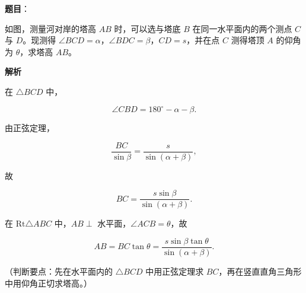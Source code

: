 \begin{answer}

\textbf{题目}：

如图，测量河对岸的塔高 $AB$ 时，可以选与塔底 $B$ 在同一水平面内的两个测点 $C$ 与 $D$。现测得 $\angle BCD=\alpha$，$\angle BDC=\beta$，$CD=s$，并在点 $C$ 测得塔顶 $A$ 的仰角为 $\theta$，求塔高 $AB$。
\nopagebreak[4]
\begin{center}\end{center}
\nopagebreak[4]
\textbf{解析}

在 $\triangle BCD$ 中，

\nopagebreak[4]
\[\angle CBD=180^\circ-\alpha-\beta.\]

由正弦定理，

\nopagebreak[4]
\[\frac{BC}{\sin\beta}=\frac{s}{\sin(\alpha+\beta)},\]

故

\nopagebreak[4]
\[BC=\frac{s\sin\beta}{\sin(\alpha+\beta)}.\]

在 $\mathrm{Rt}\triangle ABC$ 中，$AB\perp$ 水平面，$\angle ACB=\theta$，故

\nopagebreak[4]
\[AB=BC\tan\theta=\frac{s\sin\beta\tan\theta}{\sin(\alpha+\beta)}.\]

（判断要点：先在水平面内的 $\triangle BCD$ 中用正弦定理求 $BC$，再在竖直直角三角形中用仰角正切求塔高。）


\end{answer}
